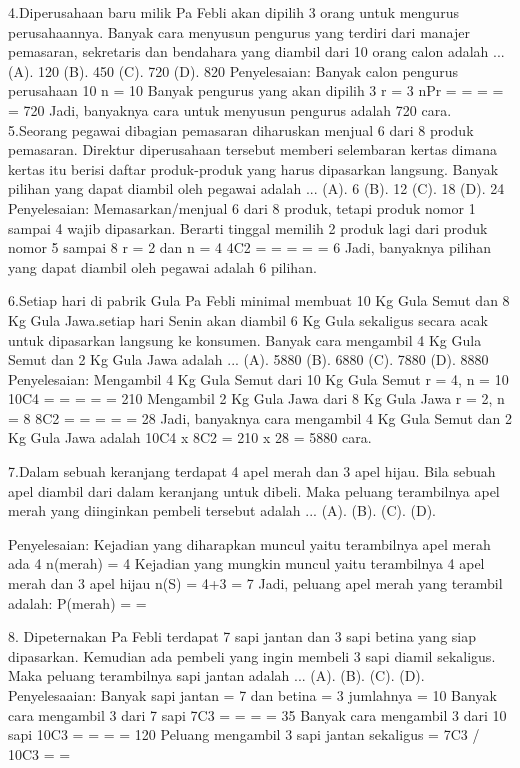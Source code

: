 \documentclass[11pt,fleqn]{book} %
\begin{document}
{{4.Diperusahaan baru milik Pa Febli akan dipilih 3 orang untuk mengurus perusahaannya. Banyak cara menyusun pengurus yang terdiri dari manajer pemasaran, sekretaris dan bendahara yang diambil dari 10 orang calon adalah ...
	(A). 120		(B). 450		(C). 720		(D). 820
Penyelesaian:
Banyak calon pengurus perusahaan 10  n = 10
Banyak pengurus yang akan dipilih 3  r = 3
nPr =  =  =  =  = 720
Jadi, banyaknya cara untuk menyusun pengurus adalah 720 cara.
5.Seorang pegawai dibagian pemasaran diharuskan menjual 6 dari 8 produk pemasaran. Direktur diperusahaan tersebut memberi selembaran kertas dimana kertas itu berisi daftar produk-produk yang harus dipasarkan langsung. Banyak pilihan yang dapat diambil oleh pegawai adalah ...
	(A). 6		(B). 12			(C). 18			(D). 24
Penyelesaian:
 Memasarkan/menjual 6 dari 8 produk, tetapi produk nomor 1 sampai 4 wajib dipasarkan.
Berarti tinggal memilih 2 produk lagi dari produk nomor 5 sampai 8
r = 2	dan 	n = 4
4C2 =   =  =  =  = 6
Jadi, banyaknya pilihan yang dapat diambil oleh pegawai adalah 6 pilihan.

6.Setiap hari di pabrik Gula Pa Febli minimal membuat 10 Kg Gula Semut dan 8 Kg Gula Jawa.setiap hari Senin akan diambil 6 Kg Gula sekaligus secara acak untuk dipasarkan langsung ke konsumen.
Banyak cara mengambil 4 Kg Gula Semut dan 2 Kg Gula Jawa adalah ...
(A). 5880		(B). 6880		(C). 7880		(D). 8880
Penyelesaian:
Mengambil 4 Kg Gula Semut dari 10 Kg Gula Semut  r = 4, n = 10
10C4 =  =  =  =  = 210
Mengambil 2 Kg Gula Jawa dari 8 Kg Gula Jawa  r = 2, n = 8
8C2 =  =  =  =  = 28
Jadi, banyaknya cara mengambil 4 Kg Gula Semut dan 2 Kg Gula Jawa adalah	10C4  x  8C2  = 210 x 28 = 5880 cara.

7.Dalam sebuah keranjang terdapat 4 apel merah dan 3 apel hijau. Bila sebuah apel diambil dari dalam keranjang untuk dibeli. Maka peluang terambilnya apel merah yang diinginkan pembeli tersebut adalah ...
(A). 			(B). 			(C). 			(D). 

Penyelesaian:
Kejadian yang diharapkan muncul yaitu terambilnya apel merah ada 4
  n(merah) =  4
Kejadian yang mungkin muncul yaitu terambilnya 4 apel merah dan 3 apel hijau 
 n(S) = 4+3 = 7
Jadi, peluang apel merah yang terambil adalah: P(merah) =  =  

8. Dipeternakan Pa Febli terdapat 7 sapi jantan dan 3 sapi betina yang siap dipasarkan. Kemudian ada pembeli yang ingin membeli 3 sapi diamil sekaligus. Maka peluang terambilnya sapi jantan adalah ...
	(A). 			
	(B).                           
	(C).  		
	(D).   
Penyelesaaian:
Banyak sapi jantan = 7 dan betina = 3  jumlahnya = 10
Banyak cara mengambil 3 dari 7 sapi
7C3 =  =  =  = 35
Banyak cara mengambil 3 dari 10 sapi
10C3 =  =  =  = 120
Peluang mengambil 3 sapi jantan sekaligus = 7C3 / 10C3 =  = 

}}
\end{document}
